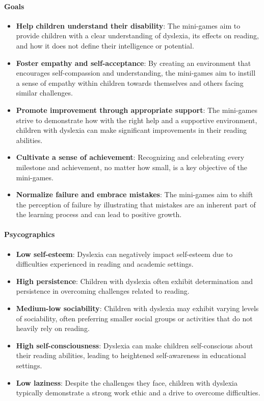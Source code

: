 \paragraph{\textbf{Goals}}
\begin{itemize}
    \item \textbf{Help children understand their disability}: The mini-games aim to provide children with a clear understanding of dyslexia, its effects on reading, and how it does not define their intelligence or potential.
    \item \textbf{Foster empathy and self-acceptance}: By creating an environment that encourages self-compassion and understanding, the mini-games aim to instill a sense of empathy within children towards themselves and others facing similar challenges.
    \item \textbf{Promote improvement through appropriate support}: The mini-games strive to demonstrate how with the right help and a supportive environment, children with dyslexia can make significant improvements in their reading abilities.
    \item \textbf{Cultivate a sense of achievement}: Recognizing and celebrating every milestone and achievement, no matter how small, is a key objective of the mini-games.
    \item \textbf{Normalize failure and embrace mistakes}: The mini-games aim to shift the perception of failure by illustrating that mistakes are an inherent part of the learning process and can lead to positive growth.
\end{itemize}

\paragraph{\textbf{Psycographics}}
\begin{itemize}
    \item \textbf{Low self-esteem}: Dyslexia can negatively impact self-esteem due to difficulties experienced in reading and academic settings. \cite{dyslexiaUnderstanding}
    \item \textbf{High persistence}: Children with dyslexia often exhibit determination and persistence in overcoming challenges related to reading. \cite{dyslexiaStatistics}
    \item \textbf{Medium-low sociability}: Children with dyslexia may exhibit varying levels of sociability, often preferring smaller social groups or activities that do not heavily rely on reading. \cite{dyslexiaClinic}
    \item \textbf{High self-consciousness}: Dyslexia can make children self-conscious about their reading abilities, leading to heightened self-awareness in educational settings.
    \item \textbf{Low laziness}: Despite the challenges they face, children with dyslexia typically demonstrate a strong work ethic and a drive to overcome difficulties. \cite{dyslexiaStatistics}
\end{itemize}

